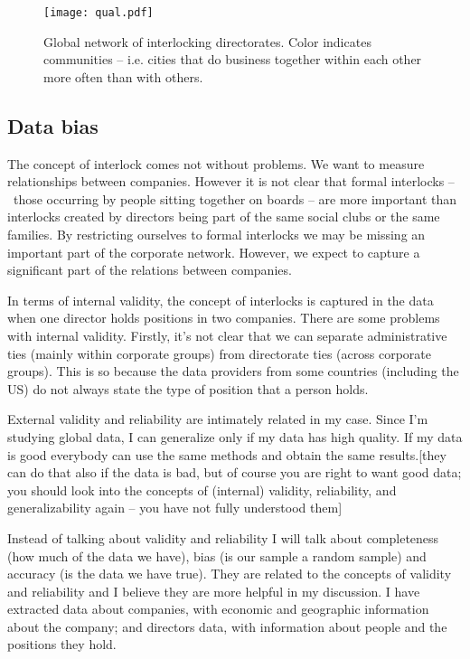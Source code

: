 \begin{figure}
\begin{center}
\texttt{[image: qual.pdf]}
\caption{Global network of interlocking directorates. Color indicates communities -- i.e. cities that do business together within each other more often than with others.}
\label{fig:qual}
\end{center}
\end{figure}

\subsection{Data bias}

The concept of interlock comes not without problems. We want to measure relationships between companies. However it is not clear that formal interlocks --~those occurring by people sitting together on boards -- are more important than interlocks created by directors being part of the same social clubs or the same families. By restricting ourselves to formal interlocks we may be missing an important part of the corporate network. However, we expect to capture a significant part of the relations between companies.



In terms of internal validity, the concept of interlocks is captured in the data when one director holds positions in two companies. There are some problems with internal validity. Firstly, it’s not clear that we can separate administrative ties (mainly within corporate groups) from directorate ties (across corporate groups). This is so because the data providers from some countries (including the US) do not always state the type of position that a person holds.

External validity and reliability are intimately related in my case. Since I’m studying global data, I can generalize only if my data has high quality. If my data is good everybody can use the same methods and obtain the same results.[they can do that also if the data is bad, but of course you are right to want good data; you should look into the concepts of (internal) validity, reliability, and generalizability again – you have not fully understood them] 

Instead of talking about validity and reliability I will talk about completeness (how much of the data we have), bias (is our sample a random sample) and accuracy (is the data we have true). They are related to the concepts of validity and reliability and I believe they are more helpful in my discussion. I have extracted data about companies, with economic and geographic information about the company; and directors data, with information about people and the positions they hold.

